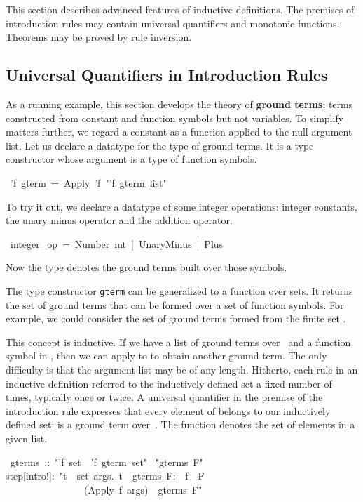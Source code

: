 This section describes advanced features of inductive definitions. 
The premises of introduction rules may contain universal quantifiers and
monotonic functions.  Theorems may be proved by rule inversion.

\subsection{Universal Quantifiers in Introduction Rules}
\label{sec:gterm-datatype}

As a running example, this section develops the theory of \textbf{ground
terms}: terms constructed from constant and function 
symbols but not variables. To simplify matters further, we regard a
constant as a function applied to the null argument  list.  Let us declare a
datatype  for the type of ground  terms. It is a type constructor
whose argument is a type of  function symbols. 
\begin{isabelle}
\ 'f\ gterm\ =\ Apply\ 'f\ "'f\ gterm\ list"
\end{isabelle}
To try it out, we declare a datatype of some integer operations: 
integer constants, the unary minus operator and the addition 
operator. 
\begin{isabelle}
\ integer_op\ =\ Number\ int\ |\ UnaryMinus\ |\ Plus
\end{isabelle}
Now the type  denotes the ground 
terms built over those symbols.

The type constructor \texttt{gterm} can be generalized to a function 
over sets.  It returns 
the set of ground terms that can be formed over a set  of function symbols. For
example,  we could consider the set of ground terms formed from the finite 
set .

This concept is inductive. If we have a list  of ground terms 
over~ and a function symbol  in , then we 
can apply  to   to obtain another ground term. 
The only difficulty is that the argument list may be of any length. Hitherto, 
each rule in an inductive definition referred to the inductively 
defined set a fixed number of times, typically once or twice. 
A universal quantifier in the premise of the introduction rule 
expresses that every element of  belongs
to our inductively defined set: is a ground term 
over~.  The function {} denotes the set of elements in a given 
list. 
\begin{isabelle}
\ gterms\ ::\ "'f\ set\ \isasymRightarrow \ 'f\ gterm\ set"\isanewline
{}\ "gterms\ F"\isanewline
{}\isanewline
step[intro!]:\ "\isasymlbrakk \isasymforall t\ \isasymin \ set\ args.\ t\ \isasymin \ gterms\ F;\ \ f\ \isasymin \ F\isasymrbrakk \isanewline
\ \ \ \ \ \ \ \ \ \ \ \ \ \ \ \isasymLongrightarrow \ (Apply\ f\ args)\ \isasymin \ gterms\
F"
\end{isabelle}

